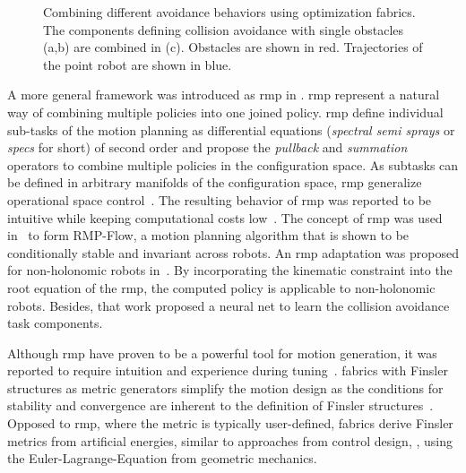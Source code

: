 %
\begin{figure}[h]
  \centering
  \begin{subfigure}{0.33\linewidth}
    \centering
    
    \caption{}
    \label{subfig:trajectory_obst1}
  \end{subfigure}%
  \begin{subfigure}{0.33\linewidth}
    \centering
    
    \caption{}
    \label{subfig:trajectory_obst2}
  \end{subfigure}%
  \begin{subfigure}{0.33\linewidth}
    \centering
    
    \caption{}
    \label{subfig:trajectory_both_obstacles}
  \end{subfigure}
  \caption{
    Combining different avoidance behaviors using optimization fabrics. The
    components defining collision avoidance with single obstacles (a,b) are
    combined in (c). Obstacles are shown in red. Trajectories of the point
    robot are shown in blue.
  }
  \label{fig:spec_combination}
\end{figure}
%
A more general framework was introduced as \acf{rmp} in
\cite{Ratliff2018,Cheng2020}. \Ac{rmp} represent a
natural way of combining multiple policies into one joined policy.
\ac{rmp} define individual sub-tasks of the motion planning as
differential equations (\textit{spectral semi sprays} or
\textit{specs} for short) of second order and propose the
\textit{pullback} and \textit{summation} operators to combine multiple policies
in the configuration space. As subtasks can be defined in arbitrary manifolds
of the configuration space, \ac{rmp} generalize operational space
control~\cite{Khatib1987}. The resulting behavior of
\ac{rmp} was reported to be
intuitive while keeping computational costs low~\cite{Ratliff2018}. The concept
of \ac{rmp} was used in~\cite{Cheng2018,Cheng2020} to form RMP-Flow, a motion
planning algorithm that is shown to be conditionally stable and invariant
across robots. An \ac{rmp} adaptation was proposed for non-holonomic robots
in~\cite{Meng2019}. By incorporating the kinematic constraint into the root
equation of the \ac{rmp}, the computed policy is applicable to non-holonomic robots.
Besides, that work proposed a neural net to learn the collision avoidance task
components. 

Although \ac{rmp} have proven to be a powerful tool for
motion generation, it was reported to require intuition and
experience during tuning~\cite{Ratliff2020}. \Acf{fabrics}
with Finsler structures as metric generators simplify the
motion design as the conditions for stability and
convergence are inherent to the definition of Finsler
structures~\cite{Ratliff2020,Ratliff2021,ratliff2023fabrics,van2022geometric}. Opposed to
\ac{rmp}, where the metric is typically user-defined,
fabrics derive Finsler metrics from artificial energies,
similar to approaches from control design, \cite{l2,l3},
using the Euler-Lagrange-Equation from geometric mechanics.

